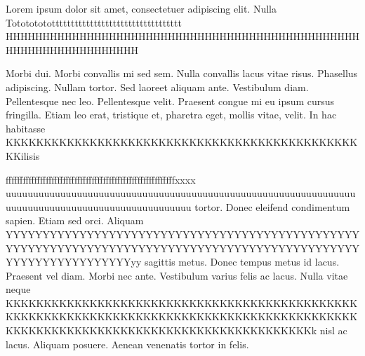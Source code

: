 \documentclass[a4paper]{article}
\begin{document}

\listoftodos

Lorem ipsum dolor sit amet, consectetuer adipiscing elit. Nulla
%
Totototototttttttttttttttttttttttttttttttttt
%
HHHHHHHHHHHHHHHHHHHHHHHHHHHHHHHHHHHHHHHHHHHHHHHHHHHHHHHHHHHHHHHHHH

Morbi dui. Morbi convallis mi sed sem. Nulla convallis lacus vitae
risus. Phasellus adipiscing. Nullam tortor. Sed laoreet aliquam
ante. Vestibulum diam. Pellentesque nec leo. Pellentesque velit.
%
Praesent congue mi eu ipsum cursus fringilla. Etiam leo erat,
tristique et, pharetra eget, mollis vitae, velit. In hac habitasse
%
KKKKKKKKKKKKKKKKKKKKKKKKKKKKKKKKKKKKKKKKKKKKKKKKilisis


fffffffffffffffffffffffffffffffffffffffffffffffffffffffffffxxxx
%
uuuuuuuuuuuuuuuuuuuuuuuuuuuuuuuuuuuuuuuuuuuuuuuuuuuuuuuuuuuuuuuuuuuuuuuuuuuuuuuuuuuuuuuuuuuuuuuuuu
tortor. Donec eleifend condimentum sapien. Etiam sed orci. Aliquam
%
YYYYYYYYYYYYYYYYYYYYYYYYYYYYYYYYYYYYYYYYYYYYYYYYYYYYYYYYYYYYYYYYYYYYYYYYYYYYYYYYYYYYYYYYYYYYYYYYYYYYYYYYYYYYYYYYYyy
sagittis metus. Donec tempus metus id lacus. Praesent vel diam.
Morbi nec ante. Vestibulum varius felis ac lacus. Nulla vitae neque
%
KKKKKKKKKKKKKKKKKKKKKKKKKKKKKKKKKKKKKKKKKKKKKKKKKKKKKKKKKKKKKKKKKKKKKKKKKKKKKKKKKKKKKKKKKKKKKKKKKKKKKKKKKKKKKKKKKKKKKKKKKKKKKKKKKKKKk
nisl ac lacus. Aliquam posuere. Aenean venenatis tortor in felis.
\end{document}
